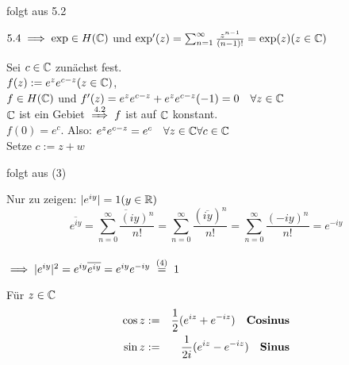 \documentclass[a4paper,twoside,DIV15,BCOR12mm]{scrbook}
\begin{document}
\begin{beweis}
\begin{liste}
\item folgt aus 5.2
\item $5.4 \implies \exp \in H(\mathbb{C} )$ und $\exp '(z) = \sum_{n=1}^{\infty}\frac{z^{n-1}}{(n-1)!} = \exp (z) (z \in \mathbb{C} )$
\item Sei $c \in \mathbb{C}$ zunächst fest. \\
$f(z) := e^ze^{c-z} (z \in \mathbb{C} )$, \\
$f\in H(\mathbb{C} )$ und $f'(z) = e^ze^{c-z} + e^ze^{c-z}(-1) = 0 \quad \forall z \in \mathbb{C}$ \\
$\mathbb{C}$ ist ein Gebiet $\folgtnach{4.2} f$ ist auf $\mathbb{C}$ konstant. \\
$f(0) = e^c$. Also: $e^ze^{c-z} = e^c \quad \forall z\in \mathbb{C} \forall c\in \mathbb{C}$ \\
Setze $c := z + w$
\item folgt aus (3)
\item Nur zu zeigen: $|e^{iy}| = 1 (y \in \mathbb{R})$ \\
$$ \overline{e^{iy}} = \overline{\sum_{n=0}^{\infty}\frac{(iy)^n}{n!}} = \sum_{n=0}^{\infty}\frac{(\overline{{iy}})^n}{n!} = \sum_{n=0}^{\infty}\frac{(-iy)^n}{n!} = e^{-iy}$$ \\
$\folgt |e^{iy}|^2 = e^{iy}\overline{e^{iy}} = e^{iy}e^{-iy} \gleichnach{(4)} 1$ 
\end{liste}
\end{beweis}

\begin{definition}
Für $z \in \mathbb{C}$ 
\begin{eqnarray}\notag \cos z &:=& \frac{1}{2}(e^{iz} + e^{-iz}) \quad \begriff{Cosinus}\\
\notag\sin z &:=& \frac{1}{2i}(e^{iz} - e^{-iz}) \quad \begriff{Sinus} \end{eqnarray}
\end{definition}
\end{document}
